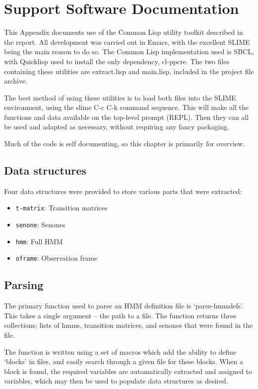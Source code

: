 \chapter{Support Software Documentation} %
\label{apdx:lisp_utils}

This Appendix documents use of the Common Lisp utility toolkit described in the report.  All development was carried out in Emacs, with the excellent SLIME being the main reason to do so.  The Common Lisp implementation used is SBCL, with Quicklisp used to install the only dependency, cl-ppcre.  The two files containing these utilities are extract.lisp and main.lisp, included in the project file archive.

The best method of using these utilities is to load both files into the SLIME environment, using the slime C-c C-k command sequence.  This will make all the functions and data available on the top-level prompt (REPL).  Then they can all be used and adapted as necessary, without requiring any fancy packaging.

Much of the code is self documenting, so this chapter is primarily for overview.

\section{Data structures} %
\label{apdx:data_structures}
	Four data structures were provided to store various parts that were extracted:
	\begin{itemize}
		\item \texttt{t-matrix}: Transition matrices
		\item \texttt{senone}: Senones
		\item \texttt{hmm}: Full HMM
		\item \texttt{oframe}: Observation frame
	\end{itemize}


\section{Parsing} %
\label{apdx:hmm_parsing}
	The primary function used to parse an HMM definition file is `parse-hmmdefs'.  This takes a single argument -- the path to a file.  The function returns three collections; lists of hmms, transition matrices, and senones that were found in the file.

	The function is written using a set of macros which add the ability to define `blocks' in files, and easily search through a given file for these blocks.  When a block is found, the required variables are automatically extracted and assigned to variables, which may then be used to populate data structures as desired.


